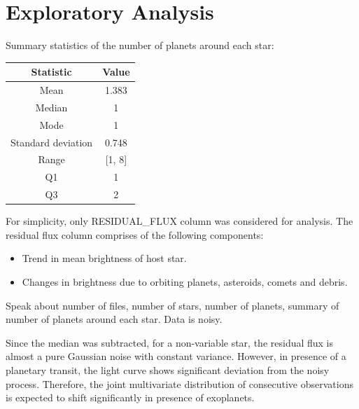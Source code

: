 \documentclass[%
aip,
amsmath,amssymb,
reprint,%
]{revtex4-1}
\begin{document}
\section{Exploratory Analysis}

Summary statistics of the number of planets around each star:

\begin{center}
 \begin{tabular}{| c | c |} 
 \hline
 \textbf{Statistic} & \textbf{Value}\\ [0.5 ex]
 \hline
 Mean & 1.383 \\ 
 \hline
 Median & 1 \\
 \hline
 Mode & 1 \\
 \hline
 Standard deviation & 0.748 \\
 \hline
 Range & [1, 8] \\
 \hline
 Q1 & 1 \\
 \hline
 Q3 & 2 \\ [1ex] 
 \hline
 \end{tabular}
\end{center}

For simplicity, only RESIDUAL\_FLUX column was considered for analysis. The residual flux column comprises of the following components:

\begin{itemize}
  \item Trend in mean brightness of host star.
  \item Changes in brightness due to orbiting planets, asteroids, comets and debris.
\end{itemize}

Speak about number of files, number of stars, number of planets, summary of number of planets around each star. Data is noisy.

Since the median was subtracted, for a non-variable star, the residual flux is almost a pure Gaussian noise with constant variance. However, in presence of a planetary transit, the light curve shows significant deviation from the noisy process. Therefore, the joint multivariate distribution of consecutive observations is expected to shift significantly in presence of exoplanets.
\end{document}
